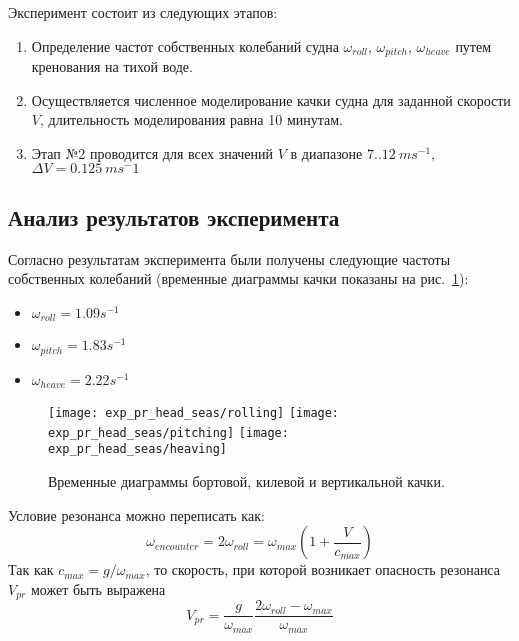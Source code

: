Эксперимент состоит из следующих этапов:
\begin{enumerate}
	\item	Определение частот собственных колебаний судна 
			$\omega_{roll}$, $\omega_{pitch}$, $\omega_{heave}$ путем кренования на тихой воде.
	\item	Осуществляется численное моделирование качки судна для заданной скорости $V$, длительность моделирования равна 10 минутам.
	\item	Этап №2	проводится для всех значений $V$ в диапазоне $7..12\ ms^{-1}$, $\Delta V=0.125\ ms^-1$ 
\end{enumerate}

\subsection{Анализ результатов эксперимента}

Согласно результатам эксперимента были получены следующие частоты собственных колебаний (временные диаграммы качки показаны на рис.~\ref{exp_pr_rolling}):
\begin{itemize}
	\item	$ \omega_{roll} = 1.09 s^{-1}$
	\item	$ \omega_{pitch} = 1.83 s^{-1}$
	\item	$ \omega_{heave} = 2.22 s^{-1}$
\end{itemize}

\begin{figure}[ht]
	\begin{center}
	\texttt{[image: exp\_pr\_head\_seas/rolling]}
	\texttt{[image: exp\_pr\_head\_seas/pitching]}
	\texttt{[image: exp\_pr\_head\_seas/heaving]}
	\end{center}
	\caption{Временные диаграммы бортовой, килевой и вертикальной качки.}
	\label{exp_pr_rolling}
\end{figure}

Условие резонанса можно переписать как:
\begin{equation}
	\omega_{encounter} = 2 \omega_{roll} = \omega_{max} \left(  1 + \frac{V}{c_{max}}  \right)
\end{equation}
Так как $c_{max} = g / \omega_{max}$, то скорость, при которой возникает опасность резонанса $V_{pr}$ может быть выражена
\begin{equation}
	V_{pr} = \frac{g}{\omega_{max}} \frac{ 2 \omega_{roll} - \omega_{max} }{ \omega_{max}}
\end{equation}
